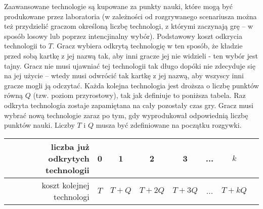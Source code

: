 \documentclass[11pt,a4paper]{article}
\begin{document}
Zaawansowane technologie są kupowane za punkty nauki, które mogą być produkowane przez laboratoria (w zależności od rozgrywanego scenariusza można też przydzielić graczom określoną liczbę technologi, z którymi zaczynają grę -- w sposób losowy lub poprzez intencjinalny wybór). Podstawowy koszt odkrycia technologii to $T$. Gracz wybiera odkrytą technologię w ten sposób, że kładzie przed sobą kartkę z jej nazwą tak, aby inni gracze jej nie widzieli - ten wybór jest tajny. Gracz nie musi ujawniać tej technologii tak długo dopóki nie zdecyduje się na jej użycie -- wtedy musi odwrócić tak kartkę z jej nazwą, aby wszyscy inni gracze mogli ją odczytać. Każda kolejna technologia jest droższa o liczbę punktów równą $Q$ (tzw. poziom przyrostowy), tak jak definiuje to poniższa tabela. Raz odkryta technologia zostaje zapamiętana na cały pozostały czas gry. Gracz musi wybrać nową technologie zaraz po tym, gdy wyprodukował odpowiednią liczbę punktów nauki. Liczby $T$ i $Q$ musza być zdefiniowane na początku rozgywki.
\begin{center}
  \begin{tabular}{| r | c | c | c | c | c | c | c |}
    \hline
    liczba już odkrytych technologii & 0 & 1 & 2 & 3  & ... & $k$ \\
    \hline
    koszt kolejnej technologi & $T$ & $T+Q$ & $T+2Q$ & $T+3Q$ & ... & $T+kQ$ \\
    \hline
  \end{tabular}
\end{center}
\end{document}
